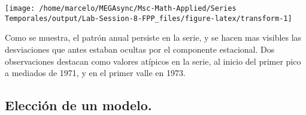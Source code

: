 \documentclass[]{article}
\newenvironment{Shaded}{\begin{snugshade}}{\end{snugshade}}
\newcommand{\DataTypeTok}[1]{\textcolor[rgb]{0.13,0.29,0.53}{#1}}
\newcommand{\DecValTok}[1]{\textcolor[rgb]{0.00,0.00,0.81}{#1}}
\newcommand{\KeywordTok}[1]{\textcolor[rgb]{0.13,0.29,0.53}{\textbf{#1}}}
\newcommand{\NormalTok}[1]{#1}
\newcommand{\OperatorTok}[1]{\textcolor[rgb]{0.81,0.36,0.00}{\textbf{#1}}}
\newcommand{\OtherTok}[1]{\textcolor[rgb]{0.56,0.35,0.01}{#1}}
\newcommand{\StringTok}[1]{\textcolor[rgb]{0.31,0.60,0.02}{#1}}
\begin{document}
\begin{Shaded}
\end{Shaded}

\begin{center}\texttt{[image: /home/marcelo/MEGAsync/Msc-Math-Applied/Series Temporales/output/Lab-Session-8-FPP\_files/figure-latex/transform-1]} \end{center}

Como se muestra, el patrón anual persiste en la serie, y se hacen mas visibles las desviaciones que antes estaban ocultas por el componente estacional. Dos observaciones destacan como valores atípicos en la serie, al inicio del primer pico a mediados de 1971, y en el primer valle en 1973.

\hypertarget{elecciuxf3n-de-un-modelo.}{%
\subsection{Elección de un modelo.}\label{elecciuxf3n-de-un-modelo.}}
\end{document}
